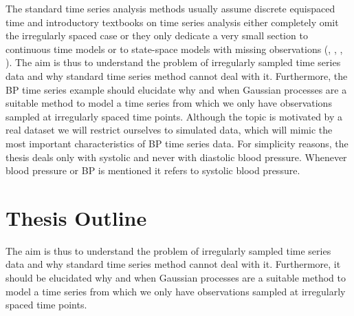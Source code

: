 The standard time series analysis methods usually assume discrete equispaced
time and introductory textbooks on time series analysis either completely omit
the irregularly spaced case or they only dedicate
a very small section to continuous time models or to state-space models
with missing observations (\citeauthor{brockwell_time_1991}, \citeauthor{brockwell_introduction_2016},
\citeauthor{cryer_time_2008}, \citeauthor{chatfield_analysis_2003}).
The aim is thus to understand the problem of irregularly sampled time series data
and why standard time series method cannot deal with it.
Furthermore, the BP time series example should elucidate why and when Gaussian processes are a
suitable method to model a time series from which we only have observations sampled at
irregularly spaced time points.
Although the topic is motivated by a real dataset we will restrict ourselves to simulated data,
which will mimic the most important characteristics of BP time series data.
For simplicity reasons, the thesis deals only with systolic and never with diastolic
blood pressure.
Whenever blood pressure or BP is mentioned it refers to systolic blood pressure.


\section{Thesis Outline}

The aim is thus to understand the problem of irregularly sampled time series data
and why standard time series method cannot deal with it.
Furthermore, it should be elucidated why and when Gaussian processes are a
suitable method to model a time series from which we only have observations sampled at
irregularly spaced time points.










